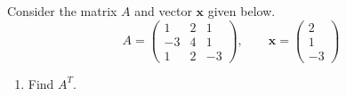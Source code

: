 \documentclass[12pt,letterpaper]{exam}
\begin{document}
\begin{questions}
\newpage
\question[15] Consider the matrix $A$ and vector $\mathbf{x}$ given below.
	\[
	A= \begin{pmatrix} 1 & 2 & 1 \\ -3 & 4 & 1 \\ 1 & 2 & -3 \end{pmatrix}, \qquad \mathbf{x}= \begin{pmatrix} 2 \\ 1 \\ -3 \end{pmatrix}
	\]

\begin{enumerate}
\item[(a)] Find $A^T$. \par\vspace{0.3cm}
\wsol{%
	\[
	A^T= \boxed{\begin{pmatrix} 1 & -3 & 1 \\ 2 & 4 & 2 \\ 1 & 1 & -3 \end{pmatrix}}
	\]%
} \vfill


\end{enumerate}
\end{questions}
\end{document}

